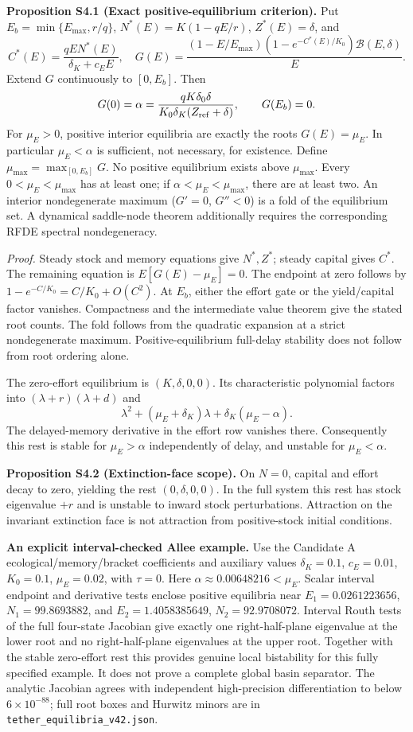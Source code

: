 \documentclass[
  10pt,
  a4paper,
]{article}
\begin{document}
\textbf{Proposition S4.1 (Exact positive-equilibrium criterion).} Put
\(E_b=\min\{E_{\max},r/q\}\), \(N^*(E)=K(1-qE/r)\), \(Z^*(E)=\delta\),
and
\[C^*(E)=\frac{qEN^*(E)}{\delta_K+c_EE},\quad G(E)=\frac{(1-E/E_{\max})(1-e^{-C^*(E)/K_0})\mathcal B(E,\delta)}{E}.\]
Extend \(G\) continuously to \([0,E_b]\). Then
\[G(0)=\alpha=\frac{qK\delta_0\delta}{K_0\delta_K(Z_{\rm ref}+\delta)},\qquad G(E_b)=0.\]
For \(\mu_E>0\), positive interior equilibria are exactly the roots
\(G(E)=\mu_E\). In particular \(\mu_E<\alpha\) is sufficient, not
necessary, for existence. Define \(\mu_{\max}=\max_{[0,E_b]}G\). No
positive equilibrium exists above \(\mu_{\max}\). Every
\(0<\mu_E<\mu_{\max}\) has at least one; if \(\alpha<\mu_E<\mu_{\max}\),
there are at least two. An interior nondegenerate maximum (\(G'=0\),
\(G''<0\)) is a fold of the equilibrium set. A dynamical saddle-node
theorem additionally requires the corresponding RFDE spectral
nondegeneracy.

\emph{Proof.} Steady stock and memory equations give \(N^*,Z^*\); steady
capital gives \(C^*\). The remaining equation is \(E[G(E)-\mu_E]=0\).
The endpoint at zero follows by \(1-e^{-C/K_0}=C/K_0+O(C^2)\). At
\(E_b\), either the effort gate or the yield/capital factor vanishes.
Compactness and the intermediate value theorem give the stated root
counts. The fold follows from the quadratic expansion at a strict
nondegenerate maximum. Positive-equilibrium full-delay stability does
not follow from root ordering alone.

The zero-effort equilibrium is \((K,\delta,0,0)\). Its characteristic
polynomial factors into \((\lambda+r)(\lambda+d)\) and
\[\lambda^2+(\mu_E+\delta_K)\lambda+\delta_K(\mu_E-\alpha).\] The
delayed-memory derivative in the effort row vanishes there. Consequently
this rest is stable for \(\mu_E>\alpha\) independently of delay, and
unstable for \(\mu_E<\alpha\).

\textbf{Proposition S4.2 (Extinction-face scope).} On \(N=0\), capital
and effort decay to zero, yielding the rest \((0,\delta,0,0)\). In the
full system this rest has stock eigenvalue \(+r\) and is unstable to
inward stock perturbations. Attraction on the invariant extinction face
is not attraction from positive-stock initial conditions.

\textbf{An explicit interval-checked Allee example.} Use the Candidate A
ecological/memory/bracket coefficients and auxiliary values
\(\delta_K=0.1\), \(c_E=0.01\), \(K_0=0.1\), \(\mu_E=0.02\), with
\(\tau=0\). Here \(\alpha\approx0.00648216<\mu_E\). Scalar interval
endpoint and derivative tests enclose positive equilibria near
\(E_1=0.0261223656\), \(N_1=99.8693882\), and \(E_2=1.4058385649\),
\(N_2=92.9708072\). Interval Routh tests of the full four-state Jacobian
give exactly one right-half-plane eigenvalue at the lower root and no
right-half-plane eigenvalues at the upper root. Together with the stable
zero-effort rest this provides genuine local bistability for this fully
specified example. It does not prove a complete global basin separator.
The analytic Jacobian agrees with independent high-precision
differentiation to below \(6\times10^{-88}\); full root boxes and
Hurwitz minors are in \texttt{tether\_equilibria\_v42.json}.
\end{document}
